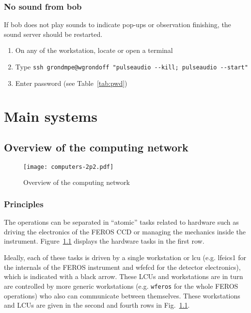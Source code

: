 \documentclass[11pt,fleqn,a4paper]{book}
\begin{document}
\subsection{No sound from bob}

If \gls{bob} does not play sounds to indicate pop-ups or observation finishing, the sound server should be restarted.

\begin{enumerate}
    \item On any of the workstation, locate or open a terminal
    \item Type \texttt{ssh grondmpe@wgrondoff "pulseaudio {-}{-}kill; pulseaudio {-}{-}start"}
    \item Enter password (see Table~\ref{tab:pwd})
\end{enumerate}



\chapter{Main systems}
\label{chap:compo}

\section{Overview of the computing network}
\begin{figure}[p]
\centering
\texttt{[image: computers-2p2.pdf]}
\caption[Overview of the computing network]{Overview of the computing network}
\label{fig:network}
\end{figure}

\subsection{Principles}
The operations can be separated in ``atomic'' tasks related to hardware such as driving the electronics of the FEROS CCD or managing the mechanics inside the instrument. Figure~\ref{fig:network} displays the hardware tasks in the first row.

Ideally, each of these tasks is driven by a single \gls{workstation} or \gls{lcu} (e.g. \gls{lfeics1} for the internals of the FEROS instrument and \gls{wfefcd} for the detector electronics), which is indicated with a black arrow.  These LCUs and workstations are in turn are controlled by more generic workstations (e.g. \texttt{wferos} for the whole FEROS operations) who also can communicate between themselves. These workstations and LCUs are given in the second and fourth rows in Fig.~\ref{fig:network}.  
\end{document}
